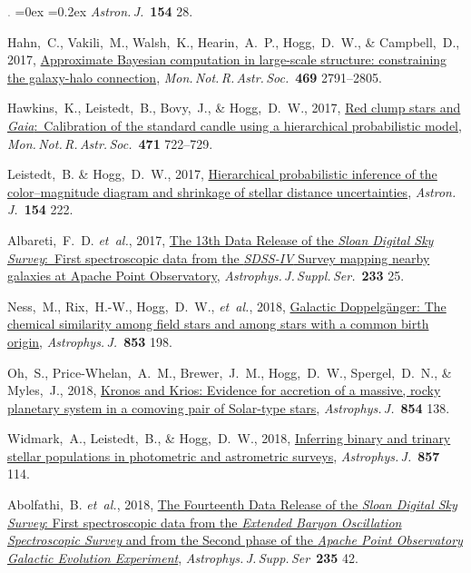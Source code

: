 \documentclass[12pt,letterpaper]{article}
\newcommand{\latin}[1]{\textsl{#1}}
\newcommand{\etal}{\latin{et~al.}}
\newcommand{\project}[1]{\textsl{#1}}
\newcommand{\doi}[2]{\href{http://dx.doi.org/#1}{{#2}}}
\newcommand{\deemph}[1]{\textcolor{grey}{\footnotesize{#1}}}
\newcommand{\pubnumber}[1]{\deemph{{#1}.}}
\newcounter{refpubnum}
\newcommand{\hogglist}{%
    \rightmargin=0in
    \leftmargin=0.18in
    \topsep=0ex
    \partopsep=0pt
    \itemsep=0.2ex
    \parsep=0pt
    \itemindent=-1.0\leftmargin
    \listparindent=0.0\leftmargin
    \settowidth{\labelsep}{~}
    \usecounter{refpubnum}
  }
\begin{document}
\begin{list}{\pubnumber{\therefpubnum}}{\hogglist}
\textit{Astron.\,J.}\ \textbf{154} 28.
\item
Hahn,~C., Vakili,~M., Walsh,~K., Hearin,~A.~P., Hogg,~D.~W., \& Campbell,~D., 2017,
\doi{10.1093/mnras/stx894}{Approximate Bayesian computation in large-scale structure: constraining the galaxy-halo connection},
\textit{Mon.\,Not.\,R.\,Astr.\,Soc.}\ \textbf{469} 2791--2805.
\item
Hawkins,~K., Leistedt,~B., Bovy,~J., \& Hogg,~D.~W., 2017,
\doi{10.1093/mnras/stx1655}{Red clump stars and \project{Gaia}:\ Calibration of the standard candle using a hierarchical probabilistic model},
\textit{Mon.\,Not.\,R.\,Astr.\,Soc.}\ \textbf{471} 722--729.
\item
Leistedt,~B. \& Hogg,~D.~W., 2017,
\doi{10.3847/1538-3881/aa91d5}{Hierarchical probabilistic inference of the color--magnitude diagram and shrinkage of stellar distance uncertainties},
\textit{Astron.\,J.}\ \textbf{154} 222.
\item
Albareti,~F.~D. \etal, 2017,
\doi{10.3847/1538-4365/aa8992}{The 13th Data Release of the \project{Sloan Digital Sky Survey}:\ First spectroscopic data from the \project{SDSS-IV} Survey mapping nearby galaxies at Apache Point Observatory},
\textit{Astrophys.\,J.\,Suppl.\,Ser.}\ \textbf{233} 25.
\item
Ness,~M., Rix,~H.-W., Hogg,~D.~W., \etal, 2018,
\doi{10.3847/1538-4357/aa9d8e}{Galactic Doppelg\"anger: The chemical similarity among field stars and among stars with a common birth origin},
\textit{Astrophys.\,J.}\ \textbf{853} 198.
\item
Oh,~S., Price-Whelan,~A.~M., Brewer,~J.~M., Hogg,~D.~W., Spergel,~D.~N., \& Myles,~J., 2018,
\doi{10.3847/1538-4357/aaab4d}{Kronos and Krios: Evidence for accretion of a massive, rocky planetary system in a comoving pair of Solar-type stars},
\textit{Astrophys.\,J.}\ \textbf{854} 138.
\item
Widmark,~A., Leistedt,~B., \& Hogg,~D.~W., 2018,
\doi{10.3847/1538-4357/aab7ee}{Inferring binary and trinary stellar populations in photometric and astrometric surveys},
\textit{Astrophys.\,J.}\ \textbf{857} 114.
\item
Abolfathi,~B. \etal, 2018,
\doi{10.3847/1538-4365/aa9e8a}{The Fourteenth Data Release of the \project{Sloan Digital Sky Survey}: First spectroscopic data from the \project{Extended Baryon Oscillation Spectroscopic Survey} and from the Second phase of the \project{Apache Point Observatory Galactic Evolution Experiment}},
\textit{Astrophys.\,J.\,Supp.\,Ser}\ \textbf{235} 42.
\item

\end{list}
\end{document}
